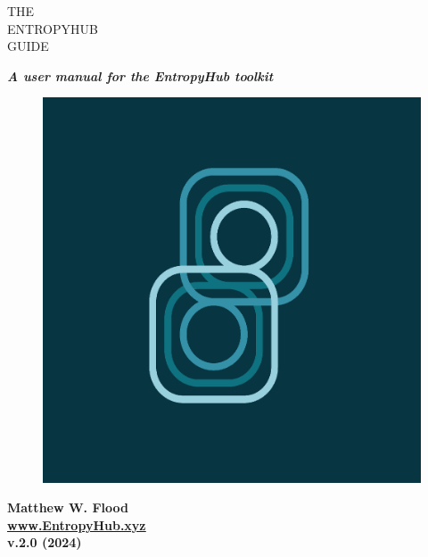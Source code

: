 \begin{titlepage}
\color{ehone}
\fontsize{60pt}{72pt}
\noindent THE \\ ENTROPYHUB \\ GUIDE\\ 
\vspace{5mm}
\normalfont		
   \begin{center}
    \Large
	\noindent \textbf{\textit{A user manual for the EntropyHub toolkit}} \\
   \end{center}
 
\vspace{7cm}
\begin{figure}
\includegraphics[width=1\linewidth]{EntropyHub_profiler.png} 
\label{fig:wrapfig}
\end{figure}

\normalsize 
\noindent \textbf{Matthew W. Flood}	
\newline \\ \newline
\noindent \href{https://www.EntropyHub.xyz}{\ul{\textbf{www.EntropyHub.xyz}}} 
\newline \\ \newline
\noindent \textbf{v.2.0 (2024)}

\normalsize
\color{black}
\end{titlepage}



